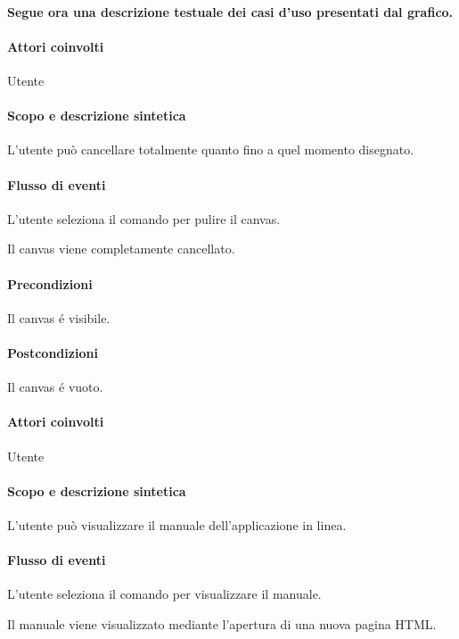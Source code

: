 \paragraph{Segue ora una descrizione testuale dei casi d'uso presentati dal grafico.}

\paragraph{Attori coinvolti} Utente
\paragraph{Scopo e descrizione sintetica}
L'utente pu\`o cancellare totalmente quanto fino a quel momento disegnato.
\paragraph{Flusso di eventi}
\begin{elenconumerato}[\textbf{}]{\subsubsecindent}
\item L'utente seleziona il comando per pulire il canvas. 
\item Il canvas viene completamente cancellato.
\end{elenconumerato}
\paragraph{Precondizioni} Il canvas \'e visibile.
\paragraph{Postcondizioni} Il canvas \'e vuoto.

\paragraph{Attori coinvolti} Utente
\paragraph{Scopo e descrizione sintetica}
L'utente pu\`o visualizzare il manuale dell'applicazione in linea.
\paragraph{Flusso di eventi}
\begin{elenconumerato}[\textbf{}]{\subsubsecindent}
\item L'utente seleziona il comando per visualizzare il manuale. 
\item Il manuale viene visualizzato mediante l'apertura di una nuova pagina HTML.
\end{elenconumerato}
